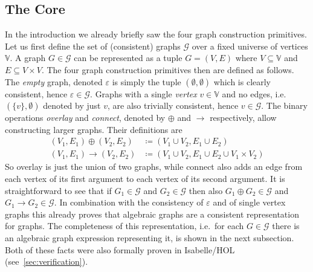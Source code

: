 \documentclass{article}
\renewcommand{\epsilon}{\varepsilon}
\newcommand{\eps}{\epsilon}
\newcommand{\overlay}{\oplus}
\newcommand{\connect}{\rightarrow}
\begin{document}
\subsection{The Core}\label{sec:core}
In the introduction we already briefly saw the four graph construction
primitives. Let us first define the set of (consistent) graphs $\mathcal{G}$
over a fixed universe of vertices $\mathbb{V}$. A graph $G \in \mathcal{G}$ can
be represented as a tuple $G=(V,E)$ where $V \subseteq \mathbb{V}$ and $E
\subseteq V \times V$.
The four graph construction primitives
then are defined as follows. The \textit{empty} graph, denoted $\eps$ is
simply the tuple $(\emptyset, \emptyset)$ which is clearly consistent, hence
$\eps \in \mathcal{G}$. Graphs with a single \textit{vertex} $v \in
\mathbb{V}$ and no edges, i.e.\ $(\{v\}, \emptyset)$  denoted by just $v$, are also
trivially consistent, hence $v \in \mathcal{G}$. The binary operations
\textit{overlay} and \textit{connect}, denoted by $\overlay$ and $\connect$
respectively, allow constructing larger graphs. Their definitions are
\begin{align*}
  (V_1, E_1) \overlay (V_2, E_2) &\coloneqq (V_1 \cup V_2, E_1 \cup E_2)\\
  (V_1, E_1) \connect (V_2, E_2) &\coloneqq (V_1 \cup V_2, E_1 \cup E_2 \cup V_1 \times V_2)
\end{align*}
So overlay is just the union of two graphs, while connect also adds an edge from
each vertex of its first argument to each vertex of its second argument. It is
straightforward to see that if $G_1 \in \mathcal{G}$ and $G_2 \in \mathcal{G}$
then also $G_1 \overlay G_2 \in \mathcal{G}$ and $G_1 \connect G_2 \in
\mathcal{G}$. In combination with the consistency of $\eps$ and of single vertex
graphs this already proves that algebraic graphs are a consistent
representation for graphs. The completeness of this representation, i.e.\ for
each $G \in \mathcal{G}$ there is an algebraic graph expression representing it,
is shown in the next subsection. Both of these facts were also formally proven in
Isabelle/HOL (see~\autoref{sec:verification}).
\end{document}
